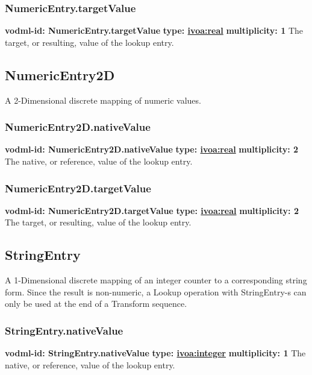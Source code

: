     \subsubsection{NumericEntry.targetValue}
      \textbf{vodml-id: NumericEntry.targetValue} \newline
      \textbf{type: \hyperref[sect:ivoa]{ivoa:real}} \newline
      \textbf{multiplicity: 1} \newline 
      The target, or resulting, value of the lookup entry.

  \subsection{NumericEntry2D}
  \label{sect:NumericEntry2D}
    A 2-Dimensional discrete mapping of numeric values.

    \subsubsection{NumericEntry2D.nativeValue}
      \textbf{vodml-id: NumericEntry2D.nativeValue} \newline
      \textbf{type: \hyperref[sect:ivoa]{ivoa:real}} \newline
      \textbf{multiplicity: 2} \newline 
      The native, or reference, value of the lookup entry.

    \subsubsection{NumericEntry2D.targetValue}
      \textbf{vodml-id: NumericEntry2D.targetValue} \newline
      \textbf{type: \hyperref[sect:ivoa]{ivoa:real}} \newline
      \textbf{multiplicity: 2} \newline 
      The target, or resulting, value of the lookup entry.

  \subsection{StringEntry}
  \label{sect:StringEntry}
    A 1-Dimensional discrete mapping of an integer counter to a corresponding string form. Since the result is non-numeric, a Lookup operation with StringEntry-s can only be used at the end of a Transform sequence.

    \subsubsection{StringEntry.nativeValue}
      \textbf{vodml-id: StringEntry.nativeValue} \newline
      \textbf{type: \hyperref[sect:ivoa]{ivoa:integer}} \newline
      \textbf{multiplicity: 1} \newline 
      The native, or reference, value of the lookup entry.

